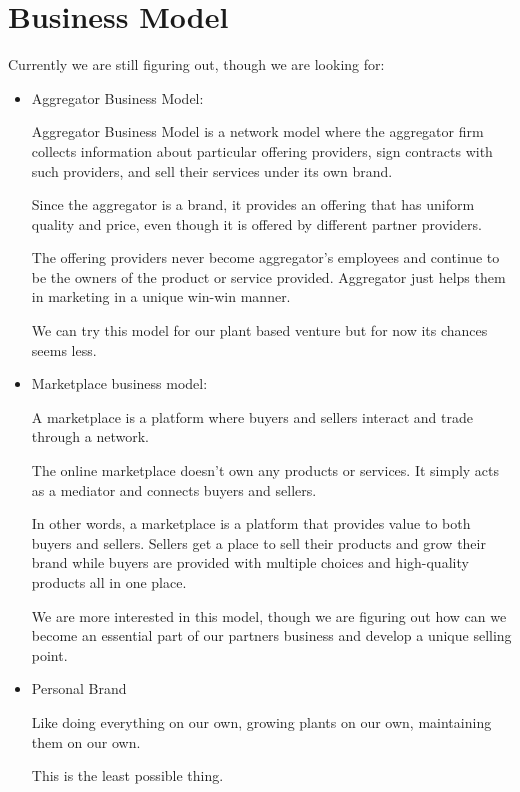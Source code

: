 \documentclass{article}
\begin{document}
\section{Business Model}

Currently we are still figuring out, though we are looking for:

\begin{itemize}

\item Aggregator Business Model:

Aggregator Business Model is a network model where the aggregator firm collects information about particular offering providers, sign contracts with such providers, and sell their services under its own brand.

Since the aggregator is a brand, it provides an offering that has uniform quality and price, even though it is offered by different partner providers.

The offering providers never become aggregator’s employees and continue to be the owners of the product or service provided. Aggregator just helps them in marketing in a unique win-win manner.

We can try this model for our plant based venture but for now its chances seems less.

\item Marketplace business model:

A marketplace is a platform where buyers and sellers interact and trade through a network.

The online marketplace doesn’t own any products or services. It simply acts as a mediator and connects buyers and sellers.

In other words, a marketplace is a platform that provides value to both buyers and sellers. Sellers get a place to sell their products and grow their brand while buyers are provided with multiple choices and high-quality products all in one place.

We are more interested in this model, though we are figuring out how can we become an essential part of our partners business and develop a unique selling point.

\item Personal Brand

Like doing everything on our own, growing plants on our own, maintaining them on our own. 

This is the least possible thing.

\end{itemize}
\end{document}
